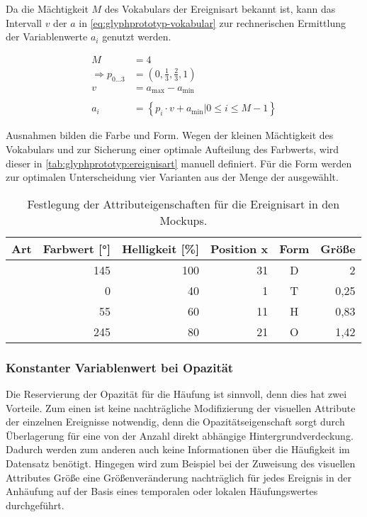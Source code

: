 Da die Mächtigkeit $M$ des Vokabulars der Ereignisart bekannt ist, kann das Intervall $v$ der  $a$ in \autoref{eq:glyphprototyp-vokabular} zur rechnerischen Ermittlung der Variablenwerte $a_i$ genutzt werden.

\begin{equation}
\begin{aligned}\label{eq:glyphprototyp-vokabular}
M &= 4\\
\Rightarrow p_{0\ldots 3} &= \left( 0, \frac 13, \frac 23, 1 \right) \\
v &= a_{\text{max}} - a_{\text{min}}\\
\\
a_i &= \left\lbrace p_i \cdot v + a_{\text{min}} \left| 0 \le i \le M-1 \right. \right\rbrace 
\end{aligned}
\end{equation}

Ausnahmen bilden die  Farbe und Form. Wegen der kleinen Mächtigkeit des Vokabulars und zur Sicherung einer optimale Aufteilung des Farbwerts, wird dieser in \autoref{tab:glyphprototyp:ereignisart} manuell definiert. Für die Form werden zur optimalen Unterscheidung vier Varianten aus der Menge der  ausgewählt.

\begin{table}
	\begin{tabularx}{\textwidth}{@{}CRRRCR@{}}
		\toprule
		Art & Farbwert [°] & Helligkeit [\%] & Position x & Form & Größe \tabularnewline
		\midrule
		 & 145 & 100 & 31 & D & 2 \tabularnewline
		 & 0   & 40  & 1  & T & 0,25 \tabularnewline
		 & 55  & 60  & 11 & H & 0,83 \tabularnewline
		 & 245 & 80  & 21 & O & 1,42 \tabularnewline
		\bottomrule
	\end{tabularx}
	\caption{Festlegung der Attributeigenschaften für die Ereignisart in den Mockups.}\label{tab:glyphprototyp:ereignisart}
\end{table}

\subsubsection*{Konstanter Variablenwert bei Opazität}\label{sec:glyphprototyp:opazitaet}
Die Reservierung der Opazität für die Häufung ist sinnvoll, denn dies hat zwei Vorteile. Zum einen ist keine nachträgliche Modifizierung der visuellen Attribute der einzelnen Ereignisse notwendig, denn die Opazitätseigenschaft sorgt durch Überlagerung für eine von der Anzahl direkt abhängige Hintergrundverdeckung. Dadurch werden zum anderen auch keine Informationen über die Häufigkeit im Datensatz benötigt. Hingegen wird zum Beispiel bei der Zuweisung des visuellen Attributes Größe eine Größenveränderung nachträglich für jedes Ereignis in der Anhäufung auf der Basis eines temporalen oder lokalen Häufungswertes durchgeführt.

